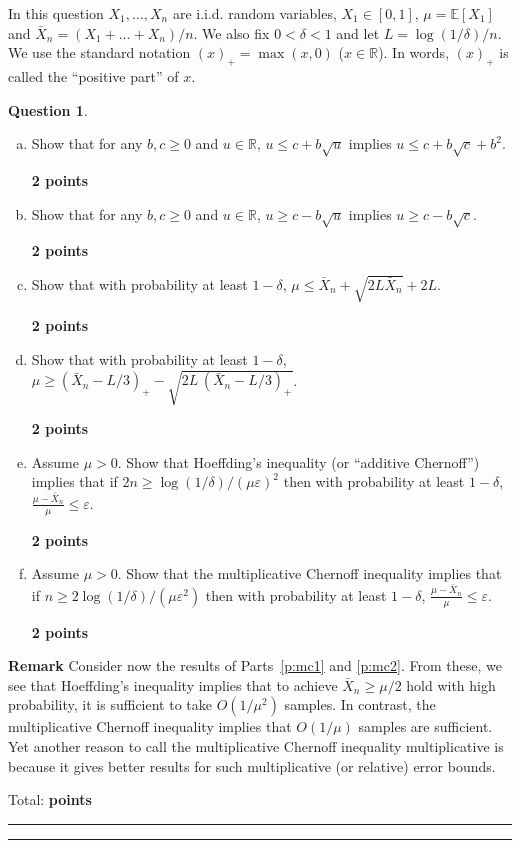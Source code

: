 \documentclass{article}
\newcommand{\eps}{\varepsilon}
\renewcommand{\epsilon}{\varepsilon}
\newcommand{\R}{\mathbb{R}}
\DeclareMathOperator*{\1}{\mathbbm{1}}
\newcommand{\E}{\mathbb E}
\newcommand{\EE}[1]{\E[#1]}
\newcounter{DocPoints}
\newcounter{QuestionPoints}
\newcommand{\points}[1]{	\par\mbox{}\par\noindent\hfill {\bf #1 points}	\addtocounter{DocPoints}{#1}
	\addtocounter{QuestionPoints}{#1}
}
\newcommand{\tpoints}[1]{        	\ifthenelse{\isempty{#1}}	{	}	{		\addtocounter{DocPoints}{#1}
		\addtocounter{QuestionPoints}{#1}
	}													 	\par\mbox{}\par\noindent\hfill {Total: \bf \arabic{QuestionPoints}\xspace points}\par\mbox{}\par\hrule\hrule
	\setcounter{QuestionPoints}{0}
}
\theoremstyle{definition}
\newtheorem{question}{Question}
\theoremstyle{remark}
\begin{document}
In this question $X_1,\dots,X_n$ are i.i.d. random variables, $X_1\in [0,1]$, $\mu = \EE{X_1}$ and $\bar X_n = (X_1+\dots+X_n)/n$.
We also fix $0< \delta < 1$ and let $L = \log(1/\delta)/n$.
We use the standard notation $(x)_+ = \max(x,0)$ ($x\in \R$). In words, $(x)_+$ is called the ``positive part'' of $x$.
\begin{question}
\mbox{}

\begin{enumerate}[(a)]

\item \label{p:q1} Show that for any $b,c\ge 0$ and $u\in\R$, $u\le c + b \sqrt{u}$ implies $u \le c + b \sqrt{c} + b^2$.
\points{2}

\item \label{p:q2} Show that for any $b,c\ge 0$ and $u\in \R$, $u \ge c - b \sqrt{u}$ implies $u \ge c - b \sqrt{c}$.
\points{2}

\item Show that with probability at least $1-\delta$, $\mu \le \bar X_n + \sqrt{2L \bar X_n} + 2L$.
\points{2}

\item Show that with probability at least $1-\delta$, $\mu \ge (\bar X_n - L/3)_+ - \sqrt{2L\, (\bar X_n - L/3)_+}$. 
\points{2}

\item \label{p:mc1} Assume $\mu>0$. Show that Hoeffding's inequality (or ``additive Chernoff'') implies that if $2n \ge \log(1/\delta)/(\mu\eps)^2$ then with probability at least $1-\delta$,  $\frac{\mu -\bar X_n}{\mu}\le \epsilon$.
\points{2}

\item \label{p:mc2} Assume $\mu>0$. Show that the multiplicative Chernoff inequality implies that if $n \ge 2\log(1/\delta)/(\mu\eps^2)$ then with probability at least $1-\delta$,  $\frac{\mu -\bar X_n}{\mu}\le \epsilon$.
\points{2}
\end{enumerate}

\noindent \textbf{Remark}
Consider now the results of Parts~\eqref{p:mc1} and \eqref{p:mc2}. From these, we see that
Hoeffding's inequality implies that to achieve $\bar X_n \ge \mu/2$ hold with high probability,
 it is sufficient to take $O(1/\mu^2)$ samples.
In contrast, the multiplicative Chernoff inequality  implies that $O(1/\mu)$ samples are sufficient.
Yet another reason to call the multiplicative Chernoff inequality multiplicative is because it gives better results for such multiplicative (or relative) error bounds.

\tpoints{}

\end{question}
\end{document}
